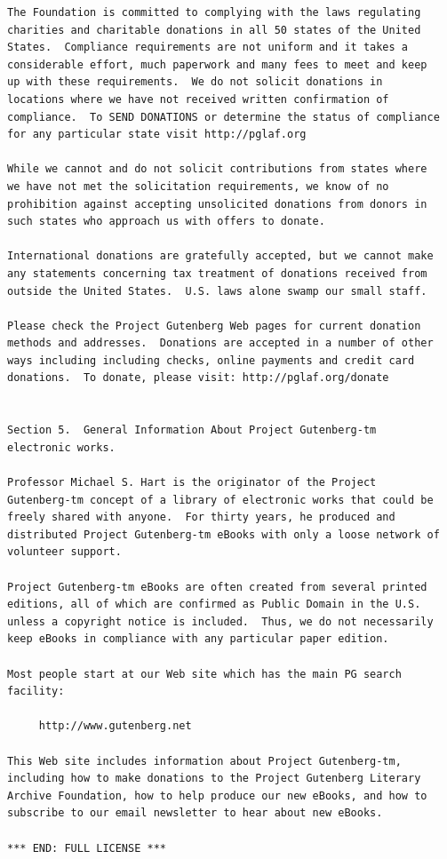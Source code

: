 \documentclass[oneside]{book}
\begin{document}
\begin{verbatim}
The Foundation is committed to complying with the laws regulating
charities and charitable donations in all 50 states of the United
States.  Compliance requirements are not uniform and it takes a
considerable effort, much paperwork and many fees to meet and keep
up with these requirements.  We do not solicit donations in
locations where we have not received written confirmation of
compliance.  To SEND DONATIONS or determine the status of compliance
for any particular state visit http://pglaf.org

While we cannot and do not solicit contributions from states where
we have not met the solicitation requirements, we know of no
prohibition against accepting unsolicited donations from donors in
such states who approach us with offers to donate.

International donations are gratefully accepted, but we cannot make
any statements concerning tax treatment of donations received from
outside the United States.  U.S. laws alone swamp our small staff.

Please check the Project Gutenberg Web pages for current donation
methods and addresses.  Donations are accepted in a number of other
ways including including checks, online payments and credit card
donations.  To donate, please visit: http://pglaf.org/donate


Section 5.  General Information About Project Gutenberg-tm
electronic works.

Professor Michael S. Hart is the originator of the Project
Gutenberg-tm concept of a library of electronic works that could be
freely shared with anyone.  For thirty years, he produced and
distributed Project Gutenberg-tm eBooks with only a loose network of
volunteer support.

Project Gutenberg-tm eBooks are often created from several printed
editions, all of which are confirmed as Public Domain in the U.S.
unless a copyright notice is included.  Thus, we do not necessarily
keep eBooks in compliance with any particular paper edition.

Most people start at our Web site which has the main PG search
facility:

     http://www.gutenberg.net

This Web site includes information about Project Gutenberg-tm,
including how to make donations to the Project Gutenberg Literary
Archive Foundation, how to help produce our new eBooks, and how to
subscribe to our email newsletter to hear about new eBooks.

*** END: FULL LICENSE ***
\end{verbatim}
\end{document}
